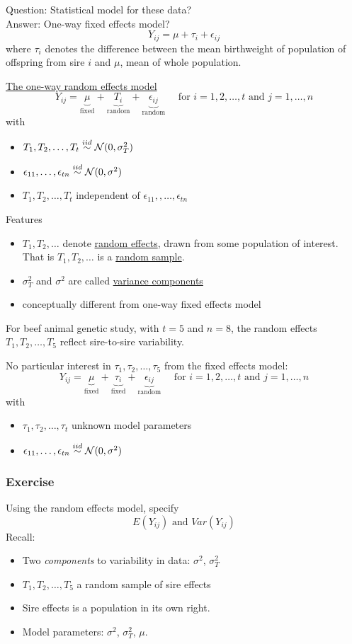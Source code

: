 Question: Statistical model for these data?\\
Answer: One-way fixed effects model?
$$
Y_{ij} = \mu + \tau_i + \epsilon_{ij}
$$
where $\tau_i$ denotes the difference between the mean birthweight of population of offspring from sire $i$ and $\mu$, mean of whole population.

\underline{The one-way random effects model}
$$
Y_{ij} = \underbrace{\mu}_{\mbox{fixed}} + \underbrace{T_i}_{\mbox{random}} + \underbrace{\epsilon_{ij}}_{\mbox{random}}  \quad \mbox{ for } i = 1, 2, \dots, t \mbox{ and }  j = 1, \dots, n
$$
with
\begin{itemize}
	\item $T_1, T_2, \dots, T_t \overset{iid}{\sim} \mathcal{N}(0, \sigma_T^2)$
	\item $\epsilon_{11}, \dots, \epsilon_{tn} \overset{iid}{\sim} \mathcal{N}(0, \sigma^2)$
	\item $T_1, T_2, \dots, T_t$ independent of $\epsilon_{11},, \dots, \epsilon_{tn}$
\end{itemize}

Features
\begin{itemize}
	\item $T_1, T_2, \dots$ denote \underline{random effects}, drawn from some population of interest.  That is $T_1, T_2, \dots$ is a \underline{random sample}.
	\item $\sigma_T^2$ and $\sigma^2$ are called \underline{variance components}
	\item conceptually different from one-way fixed effects model
\end{itemize}

For beef animal genetic study, with $t = 5$ and $n = 8$, the random effects $T_1, T_2, \dots, T_5$ reflect sire-to-sire variability.

No particular interest in $\tau_1, \tau_2, \dots, \tau_5$ from the fixed effects model:
$$
Y_{ij} = \underbrace{\mu}_{\mbox{fixed}} + \underbrace{\tau_i}_{\mbox{fixed}} + \underbrace{\epsilon_{ij}}_{\mbox{random}}  \quad \mbox{ for } i = 1, 2, \dots, t \mbox{ and }  j = 1, \dots, n
$$
with
\begin{itemize}
	\item $\tau_1, \tau_2, \dots, \tau_t$ unknown model parameters
	\item $\epsilon_{11}, \dots, \epsilon_{tn} \overset{iid}{\sim} \mathcal{N}(0, \sigma^2)$
\end{itemize}

\subsubsection*{Exercise}
Using the random effects model, specify
$$
\textit{E}(Y_{ij}) \mbox{ and } \textit{Var}(Y_{ij})
$$
Recall:
\begin{itemize}
	\item Two {\it components} to variability in data: $\sigma^2$, $\sigma_T^2$
	\item $T_1, T_2, \dots, T_5$ a random sample of sire effects
	\item Sire effects is a population in its own right.
	\item Model parameters: $\sigma^2$, $\sigma_T^2$, $\mu$.
\end{itemize}

